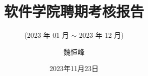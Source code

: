 \documentclass[]{beamer}
\title[]{软件学院聘期考核报告}
\subtitle{(2023 年 01 月 $\sim$ 2023 年 12 月)}
\author[魏恒峰]{魏恒峰}
\institute{hfwei@nju.edu.cn}
\date{2023年11月23日}
\begin{document}
\maketitle





\thankyou{}
\end{document}
